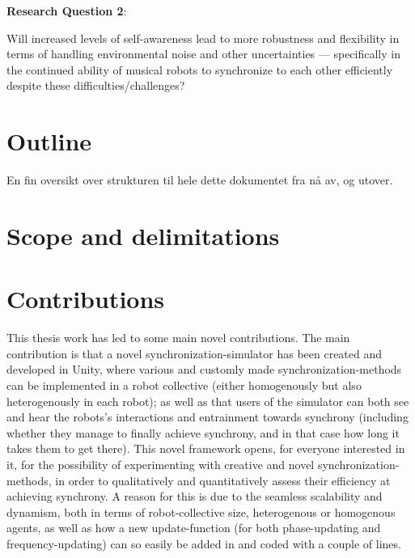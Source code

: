 	\textbf{Research Question 2}:
	
	Will increased levels of self-awareness lead to more robustness and flexibility in terms of handling environmental noise and other uncertainties — specifically in the continued ability of musical robots to synchronize to each other efficiently despite these difficulties/challenges? \nl
	
	
	
	
	
	
	
	\section{Outline}
	En fin  oversikt over strukturen til hele dette dokumentet fra nå av, og utover.


	\section{Scope and delimitations}

	\section{Contributions}
	This thesis work has led to some main novel contributions. The main contribution is that a novel synchronization-simulator has been created and developed in Unity, where various and customly made synchronization-methods can be implemented in a robot collective (either homogenously but also heterogenously in each robot); as well as that users of the simulator can both see and hear the robots's interactions and entrainment towards synchrony (including whether they manage to finally achieve synchrony, and in that case how long it takes them to get there). This novel framework opens, for everyone interested in it, for the possibility of experimenting with creative and novel synchronization-methods, in order to qualitatively and quantitatively assess their efficiency at achieving synchrony. A reason for this is due to the seamless scalability and dynamism, both in terms of robot-collective size, heterogenous or homogenous agents, as well as how a new update-function (for both phase-updating and frequency-updating) can so easily be added in and coded with a couple of lines.